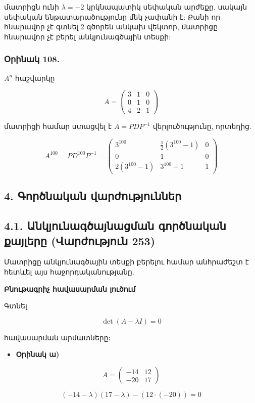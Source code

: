 \documentclass[12pt, a4paper]{article}
\begin{document}
մատրիցն ունի $\lambda = -2$ կրկնապատիկ սեփական արժեքը, սակայն սեփական ենթատարածությունը մեկ չափանի է: Քանի որ հնարավոր չէ գտնել 2 գծորեն անկախ վեկտոր, մատրիցը հնարավոր չէ բերել անկյունագծային տեսքի:

\subsubsection{Օրինակ 108.}
$A^n$ հաշվարկը

$$
A =
\begin{pmatrix}
3 & 1 & 0 \\
0 & 1 & 0 \\
4 & 2 & 1
\end{pmatrix}
$$

մատրիցի համար ստացվել է $A = P D P^{-1}$ վերլուծությունը, որտեղից.

$$
A^{100} = P D^{100} P^{-1}=
\begin{pmatrix}
3^{100} & \frac{1}{2}(3^{100} - 1) & 0 \\
0 & 1 & 0 \\
2(3^{100} - 1) & 3^{100} - 1 & 1
\end{pmatrix}
$$

\subsection{4. Գործնական վարժություններ}

\subsection{4.1. Անկյունագծայնացման գործնական քայլերը (Վարժություն 253)}

Մատրիցը անկյունագծային տեսքի բերելու համար անհրաժեշտ է հետևել այս հաջորդականությանը.

\textbf{Բնութագրիչ հավասարման լուծում}

Գտնել

$$
\det(A - \lambda I) = 0
$$

հավասարման արմատները։

\begin{itemize}
    \item \textbf{Օրինակ ա)}
\end{itemize}

$$
A =
\begin{pmatrix}
-14 & 12 \\
-20 & 17
\end{pmatrix}
$$

$$
(-14 - \lambda)(17 - \lambda) - (12 \cdot (-20)) = 0
$$
\end{document}
